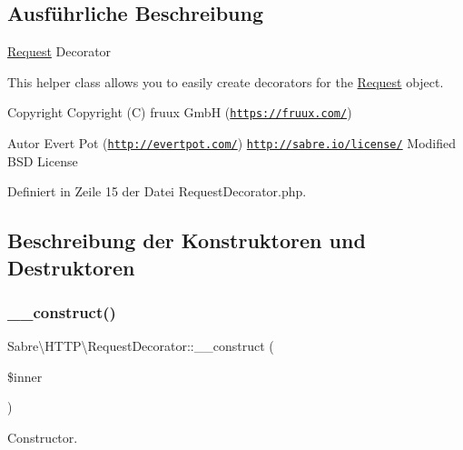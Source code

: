 \subsection{Ausführliche Beschreibung}
\mbox{\hyperlink{class_sabre_1_1_h_t_t_p_1_1_request}{Request}} Decorator

This helper class allows you to easily create decorators for the \mbox{\hyperlink{class_sabre_1_1_h_t_t_p_1_1_request}{Request}} object.

\begin{DoxyCopyright}{Copyright}
Copyright (C) fruux GmbH (\href{https://fruux.com/}{\tt https\+://fruux.\+com/}) 
\end{DoxyCopyright}
\begin{DoxyAuthor}{Autor}
Evert Pot (\href{http://evertpot.com/}{\tt http\+://evertpot.\+com/})  \href{http://sabre.io/license/}{\tt http\+://sabre.\+io/license/} Modified B\+SD License 
\end{DoxyAuthor}


Definiert in Zeile 15 der Datei Request\+Decorator.\+php.



\subsection{Beschreibung der Konstruktoren und Destruktoren}
\mbox{\label{class_sabre_1_1_h_t_t_p_1_1_request_decorator_ac403c648cdd078a700d33e442847a3bf}} 
\subsubsection{\texorpdfstring{\+\_\+\+\_\+construct()}{\_\_construct()}}
{\footnotesize\ttfamily Sabre\textbackslash{}\+H\+T\+T\+P\textbackslash{}\+Request\+Decorator\+::\+\_\+\+\_\+construct (\begin{DoxyParamCaption}\item[{\mbox{\hyperlink{interface_sabre_1_1_h_t_t_p_1_1_request_interface}{Request\+Interface}}}]{\$inner }\end{DoxyParamCaption})}

Constructor.


